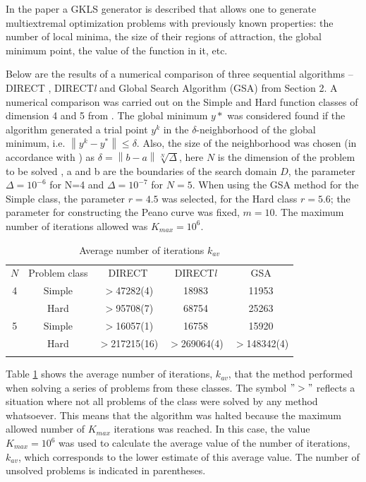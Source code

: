 \documentclass{svproc}
\begin{document}
In the paper \cite{Gaviano2003} a GKLS generator is described that allows one to generate multiextremal optimization problems with previously known properties: the number of local minima, the size of their regions of attraction, the global minimum point, the value of the function in it, etc.

Below are the results of a numerical comparison of three sequential algorithms -- DIRECT \cite{Jones2009}, DIRECT\textit{l} \cite{Gablonsky2001} and Global Search Algorithm (GSA) from Section 2.  A numerical comparison was carried out on the Simple and Hard function classes of dimension 4 and 5 from \cite{Gaviano2003}. The global minimum $y*$ was considered found if the algorithm generated a trial point $y^k$ in the $\delta$-neighborhood of the global minimum, i.e. $\left\| {{y}^{k}}-{{y}^{*}} \right\| \leqslant \delta $.  Also, the size of the neighborhood was chosen (in accordance with \cite{Sergeyev2006}) as $\delta =\left\| b-a \right\|\sqrt[N]{\Delta }$, here $N$ is the dimension of the problem to be solved , a and b are the boundaries  of the search domain $D$, the parameter  $\Delta ={{10}^{-6}}$ for N=4 and $\Delta ={{10}^{-7}}$ for $N=5$. When using the GSA method for the Simple class, the parameter $r=4.5$ was selected, for the Hard class $r=5.6$; the parameter for constructing the Peano curve was fixed, $m=10$. The maximum number of iterations allowed was $K_{max} = 10^6$.


\begin{table}
	\caption{Average number of iterations $k_{av}$}\label{table:average_iters}
	\center
	\begin{tabular}{ccccc}
		\hline\noalign{\smallskip}
  	 $N$ & Problem class & DIRECT & DIRECT\textit{l} & GSA \\
		\noalign{\smallskip} \hline \noalign{\smallskip}
			4 &	Simple& $>$47282(4) &	18983 &	11953 \\
	      & Hard &	$>$95708(7) &	68754 &	25263 \\
		\noalign{\smallskip}
			5	& Simple &	$>$16057(1) &	16758 &	15920 \\
				& Hard &	$>$217215(16) &	$>$269064(4) & $>$148342(4) \\
		\noalign{\smallskip}\hline
	\end{tabular}
\end{table}


   Table \ref{table:average_iters} shows the average number of iterations, $k_{av}$, that the method performed when solving a series of problems from these classes. The symbol \(">"\) reflects a situation where not all problems of the class were solved by any method whatsoever. This means that the algorithm was halted because the maximum allowed number of $K_{max}$ iterations was reached. In this case, the value $K_{max} = 10^6$ was used to calculate the average value of the number of iterations, $k_{av}$, which corresponds to the lower estimate of this average value. The number of unsolved problems is indicated in parentheses.
   
\end{document}
